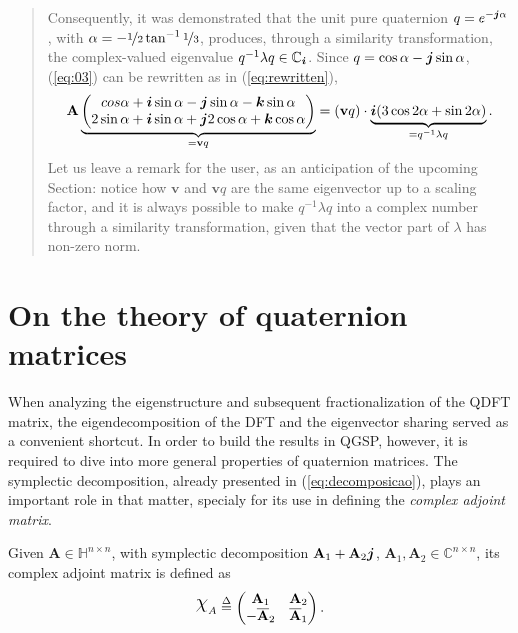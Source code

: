 \begin{quotation}
\begin{example}
Consequently, it was demonstrated that the unit pure quaternion $ q = e^{- \boldsymbol{j} \alpha} $, with $ \alpha = - \displaystyle \nicefrac{1}{2} \tan^{-1} \nicefrac{1}{3} $, produces, through a similarity transformation, the complex-valued eigenvalue $ q^{-1} \lambda q \in \mathbb{C}_{\boldsymbol{i}}$. Since $q = \cos \alpha - \boldsymbol{j} \sin \alpha $, (\ref{eq:03}) can be rewritten as in (\ref{eq:rewritten}),
\begin{equation}
\mathbf{A} \underbrace{\begin{pmatrix}
cos \alpha + \boldsymbol{i} \sin \alpha - \boldsymbol{j} \sin \alpha - \boldsymbol{k} \sin \alpha \\
2 \sin \alpha + \boldsymbol{i} \sin \alpha + \boldsymbol{j} 2 \cos \alpha + \boldsymbol{k} \cos \alpha
\end{pmatrix}}_{= \mathbf{v} q} =
(\mathbf{v} q) \cdot \underbrace{\boldsymbol{i} (3 \cos 2\alpha + \sin 2\alpha)}_{= q^{-1} \lambda q}.
\end{equation}
Let us leave a remark for the user, as an anticipation of the upcoming Section: notice how $\mathbf{v}$ and $\mathbf{v}q$ are the same eigenvector up to a scaling factor, and it is always possible to make $q^{-1} \lambda q$ into a complex number through a similarity transformation, given that the vector part of $\lambda$ has non-zero norm.
\end{example}
\end{quotation}


\section{On the theory of quaternion matrices}

When analyzing the eigenstructure and subsequent fractionalization of the QDFT matrix, the eigendecomposition of the DFT and the eigenvector sharing served as a convenient shortcut. In order to build the results in QGSP, however, it is required to dive into more general properties of quaternion matrices. The symplectic decomposition, already presented in (\ref{eq:decomposicao}), plays an important role in that matter, specialy for its use in defining the \textit{complex adjoint matrix}.

\begin{definition}
\label{def:complexadjoint}
Given $ \mathbf{A} \in \mathbb{H}^{n \times n} $, with symplectic decomposition $ \mathbf{A}_1 + \mathbf{A}_2 \boldsymbol{j}$, $ \mathbf{A}_1,\mathbf{A}_2 \in \mathbb{C}^{n \times n} $, its complex adjoint matrix is defined as
\begin{equation}
\rchi_{A} \overset{\Delta}{=}
\begin{pmatrix}
\mathbf{A}_1 & \mathbf{A}_2\\ 
- \overline{\mathbf{A}}_2 & \overline{\mathbf{A}}_1
\end{pmatrix}.
\end{equation}
\end{definition}


